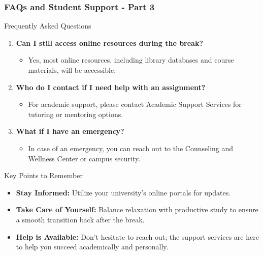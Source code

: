 \documentclass[aspectratio=169]{beamer}
\begin{document}
\begin{frame}[fragile]
    \frametitle{FAQs and Student Support - Part 3}
    \begin{block}{Frequently Asked Questions}
        \begin{enumerate}
            \item \textbf{Can I still access online resources during the break?}
            \begin{itemize}
                \item Yes, most online resources, including library databases and course materials, will be accessible.
            \end{itemize}

            \item \textbf{Who do I contact if I need help with an assignment?}
            \begin{itemize}
                \item For academic support, please contact Academic Support Services for tutoring or mentoring options.
            \end{itemize}
            
            \item \textbf{What if I have an emergency?}
            \begin{itemize}
                \item In case of an emergency, you can reach out to the Counseling and Wellness Center or campus security.
            \end{itemize}
        \end{enumerate}
    \end{block}

    \begin{block}{Key Points to Remember}
        \begin{itemize}
            \item \textbf{Stay Informed:} Utilize your university’s online portals for updates.
            \item \textbf{Take Care of Yourself:} Balance relaxation with productive study to ensure a smooth transition back after the break.
            \item \textbf{Help is Available:} Don’t hesitate to reach out; the support services are here to help you succeed academically and personally.
        \end{itemize}
    \end{block}
\end{frame}
\end{document}

